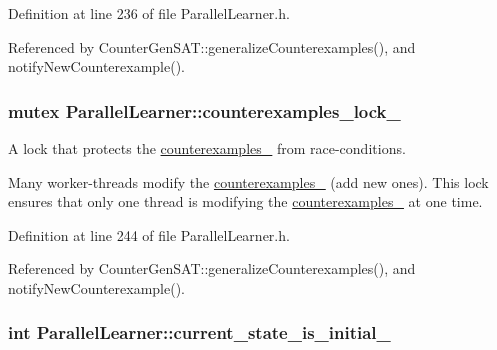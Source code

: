Definition at line 236 of file Parallel\-Learner.\-h.



Referenced by Counter\-Gen\-S\-A\-T\-::generalize\-Counterexamples(), and notify\-New\-Counterexample().

\hypertarget{classParallelLearner_a454c81908f2d3cb4c24b042739adc4ec}{
\subsubsection[{counterexamples\-\_\-lock\-\_\-}]{\setlength{\rightskip}{0pt plus 5cm}mutex Parallel\-Learner\-::counterexamples\-\_\-lock\-\_\-}}\label{classParallelLearner_a454c81908f2d3cb4c24b042739adc4ec}


A lock that protects the \hyperlink{classParallelLearner_a974943e3e2145b3407f689b64acdd33f}{counterexamples\-\_\-} from race-\/conditions. 

Many worker-\/threads modify the \hyperlink{classParallelLearner_a974943e3e2145b3407f689b64acdd33f}{counterexamples\-\_\-} (add new ones). This lock ensures that only one thread is modifying the \hyperlink{classParallelLearner_a974943e3e2145b3407f689b64acdd33f}{counterexamples\-\_\-} at one time. 

Definition at line 244 of file Parallel\-Learner.\-h.



Referenced by Counter\-Gen\-S\-A\-T\-::generalize\-Counterexamples(), and notify\-New\-Counterexample().

\hypertarget{classParallelLearner_ae9293a4afd3c52690bcac2ad03884121}{
\subsubsection[{current\-\_\-state\-\_\-is\-\_\-initial\-\_\-}]{\setlength{\rightskip}{0pt plus 5cm}int Parallel\-Learner\-::current\-\_\-state\-\_\-is\-\_\-initial\-\_\-\hspace{0.3cm}{\ttfamily [protected]}}}\label{classParallelLearner_ae9293a4afd3c52690bcac2ad03884121}


